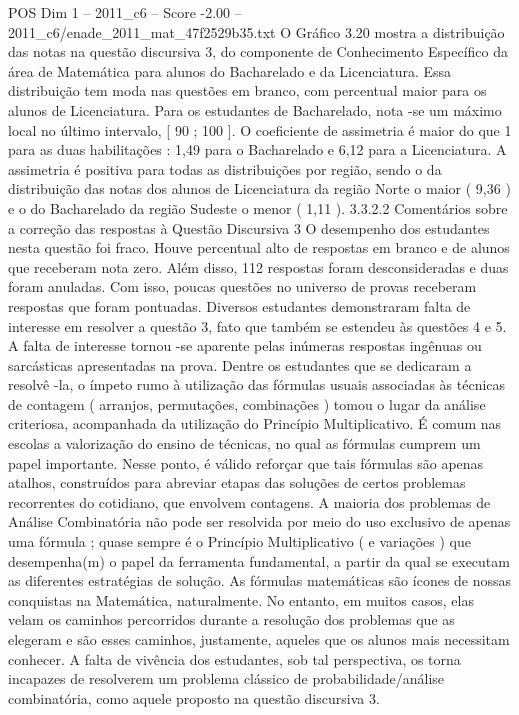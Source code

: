 \begin{textsample}{POS Dim 1 – 2011\_c6 – Score -2.00 – 2011\_c6/enade\_2011\_mat\_47f2529b35.txt}
O Gráfico 3.20 mostra a distribuição das notas na questão discursiva 3, do componente de Conhecimento Específico da área de Matemática para alunos do Bacharelado e da Licenciatura.
Essa distribuição tem moda nas questões em branco, com percentual maior para os alunos de Licenciatura.
Para os estudantes de Bacharelado, nota -se um máximo local no último intervalo, [ 90 ; 100 ].
O coeficiente de assimetria é maior do que 1 para as duas habilitações : 1,49 para o Bacharelado e 6,12 para a Licenciatura.
A assimetria é positiva para todas as distribuições por região, sendo o da distribuição das notas dos alunos de Licenciatura da região Norte o maior ( 9,36 ) e o do Bacharelado da região Sudeste o menor ( 1,11 ). 3.3.2.2 Comentários sobre a correção das respostas à Questão Discursiva 3 O desempenho dos estudantes nesta questão foi fraco.
Houve percentual alto de respostas em branco e de alunos que receberam nota zero.
Além disso, 112 respostas foram desconsideradas e duas foram anuladas.
Com isso, poucas questões no universo de provas receberam respostas que foram pontuadas.
Diversos estudantes demonstraram falta de interesse em resolver a questão 3, fato que também se estendeu às questões 4 e 5.
A falta de interesse tornou -se aparente pelas inúmeras respostas ingênuas ou sarcásticas apresentadas na prova.
Dentre os estudantes que se dedicaram a resolvê -la, o ímpeto rumo à utilização das fórmulas usuais associadas às técnicas de contagem ( arranjos, permutações, combinações ) tomou o lugar da análise criteriosa, acompanhada da utilização do Princípio Multiplicativo.
É comum nas escolas a valorização do ensino de técnicas, no qual as fórmulas cumprem um papel importante.
Nesse ponto, é válido reforçar que tais fórmulas são apenas atalhos, construídos para abreviar etapas das soluções de certos problemas recorrentes do cotidiano, que envolvem contagens.
A maioria dos problemas de Análise Combinatória não pode ser resolvida por meio do uso exclusivo de apenas uma fórmula ; quase sempre é o Princípio Multiplicativo ( e variações ) que desempenha(m) o papel da ferramenta fundamental, a partir da qual se executam as diferentes estratégias de solução.
As fórmulas matemáticas são ícones de nossas conquistas na Matemática, naturalmente.
No entanto, em muitos casos, elas velam os caminhos percorridos durante a resolução dos problemas que as elegeram e são esses caminhos, justamente, aqueles que os alunos mais necessitam conhecer.
A falta de vivência dos estudantes, sob tal perspectiva, os torna incapazes de resolverem um problema clássico de probabilidade/análise combinatória, como aquele proposto na questão discursiva 3.

\end{textsample}

